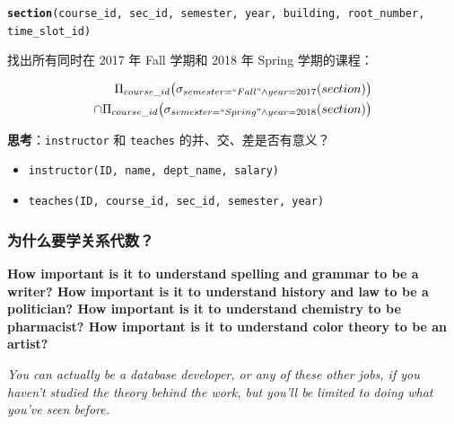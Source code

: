 \documentclass[aspectratio=169, 14pt]{beamer}
\begin{document}
\begin{frame}
    \texttt{\textbf{section}(course\_id, sec\_id, semester, year, building, root\_number, time\_slot\_id)}
    
        找出所有同时在 2017 年 Fall 学期和 2018 年 Spring 学期的课程：
        
        \begin{equation*}
            \begin{split}
                \Pi_{course\_id}\bigl(\sigma_{semester=``Fall" \land year=2017}(section)\bigr) \\ \cap
                \Pi_{course\_id}\bigl(\sigma_{semester=``Spring" \land year=2018}(section)\bigr)
            \end{split}
        \end{equation*}
    
\end{frame}

\begin{frame}

    {\large {}} \textbf{思考}：\texttt{instructor} 和 \texttt{teaches} 的并、交、差是否有意义？ 

    \begin{itemize}
        \item \texttt{instructor(ID, name, dept\_name, salary)}
        \item \texttt{teaches(ID, course\_id, sec\_id, semester, year)}
    \end{itemize}  
\pause
{} 
\end{frame}

\begin{frame}
    \frametitle{为什么要学关系代数？}    
    \textbf{How important is it to understand spelling and grammar to be a writer? How important is it to understand history and law to be a politician? How important is it to understand chemistry to be pharmacist? How important is it to understand color theory to be an artist?}

    \emph{You can actually be a database developer, or any of these other jobs, if you haven't studied the theory behind the work, but you'll be limited to doing what you've seen before.}

\end{frame}
\end{document}
